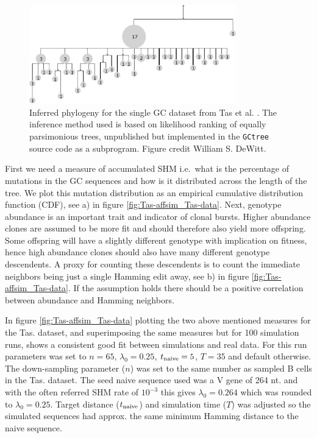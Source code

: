 \begin{figure}[!ht]
    \centering
    \includegraphics[width=0.8\textwidth]{figures/Tas_tree.pdf}
    \caption{
        \label{fig:Tas_tree}
        Inferred phylogeny for the single GC dataset from Tas et al. \cite{tas2016visualizing}.
        The inference method used is based on likelihood ranking of equally parsimonious trees, unpublished but implemented in the \texttt{GCtree} source code as a subprogram.
        Figure credit William S. DeWitt.
    }
\end{figure}


First we need a measure of accumulated SHM i.e.\ what is the percentage of mutations in the GC sequences and how is it distributed across the length of the tree.
We plot this mutation distribution as an empirical cumulative distribution function (CDF), see a) in figure \ref{fig:Tas-affsim_Tas-data}.
Next, genotype abundance is an important trait and indicator of clonal bursts.
Higher abundance clones are assumed to be more fit and should therefore also yield more offspring.
Some offspring will have a slightly different genotype with implication on fitness, hence high abundance clones should also have many different genotype descendents.
A proxy for counting these descendents is to count the immediate neighbors being just a single Hamming edit away, see b) in figure \ref{fig:Tas-affsim_Tas-data}.
If the assumption holds there should be a positive correlation between abundance and Hamming neighbors.

In figure \ref{fig:Tas-affsim_Tas-data} plotting the two above mentioned measures for the Tas. dataset, and superimposing the same measures but for 100 simulation runs, shows a consistent good fit between simulations and real data.
For this run parameters was set to $n=65$, $\lambda_0=0.25$, $t_{\text{naive}}=5$, $T=35$ and default otherwise.
The down-sampling parameter ($n$) was set to the same number as sampled B cells in the Tas. dataset.
The seed naive sequence used was a V gene of 264 nt. and with the often referred SHM rate of $10^{-3}$ \cite{victora2012germinal} this gives $\lambda_0=0.264$ which was rounded to $\lambda_0=0.25$.
Target distance ($t_{\text{naive}}$) and simulation time ($T$) was adjusted so the simulated sequences had approx. the same minimum Hamming distance to the naive sequence.

